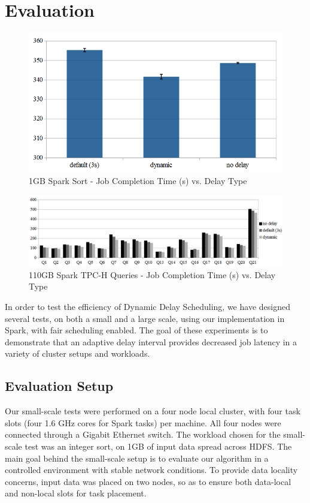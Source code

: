 
\section{Evaluation}\label{sec:eval}


\begin{figure}[t]
        \includegraphics[width=\linewidth]{./smallscale.png}
        \caption{1GB Spark Sort - Job Completion Time (s) vs. Delay Type}
        \label{fig:smallscale}
    \endminipage \hfill
\end{figure}

\begin{figure}[t]
    \minipage{\textwidth}
        \includegraphics[width=\linewidth]{./TPCH.png}
        \caption{110GB Spark TPC-H Queries - Job Completion Time (s) vs. Delay Type}
        \label{fig:largescale}
    \endminipage \hfill
\end{figure}



In order to test the efficiency of Dynamic Delay Scheduling, we have designed several 
tests, on both a small and a large scale, using our implementation in Spark, with fair
scheduling enabled. The goal of
these experiments is to demonstrate that an adaptive delay interval provides decreased
job latency in a variety of cluster setups and workloads.

\subsection{Evaluation Setup}
Our small-scale tests were performed on a four node local cluster, with four
task slots (four 1.6 GHz cores for Spark tasks) per machine. All four nodes were
connected through a Gigabit Ethernet switch. The workload chosen for the
small-scale test was an integer sort, on 1GB of input data spread across HDFS.
The main goal behind the small-scale setup is to evaluate our algorithm in a
controlled environment with stable network conditions. To provide data locality
concerns, input data was placed on two nodes, so as to ensure both data-local
and non-local slots for task placement.

